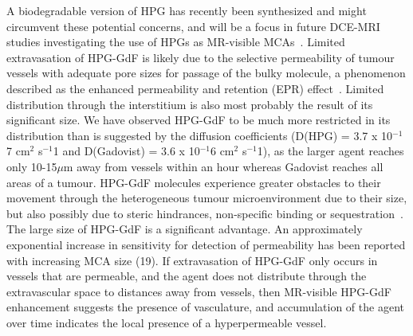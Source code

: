 A biodegradable version of HPG has recently been synthesized and might circumvent these potential concerns, and will be a focus in future \acs{DCE-MRI} studies investigating the use of HPGs as MR-visible \acs{MCA}s~\cite{Shenoi:2013id}.
Limited extravasation of \acs{HPG-GdF} is likely due to the selective permeability of tumour vessels with adequate pore sizes for passage of the bulky molecule, a phenomenon described as the enhanced permeability and retention (\acs{EPR}) effect~\cite{Maeda:2013hq}.
Limited distribution through the interstitium is also most probably the result of its significant size.
We have observed \acs{HPG-GdF} to be much more restricted in its distribution than is suggested by the diffusion coefficients (D(HPG) = 3.7 x 10$^{-1}$7 cm$^2$ s$^{-1}$1 and D(Gadovist) = 3.6 x 10$^{-1}$6 cm$^2$ s$^{-1}$1), as the larger agent reaches only 10-15$\mu$m away from vessels within an hour whereas Gadovist reaches all areas of a tumour.
\acs{HPG-GdF} molecules experience greater obstacles to their movement through the heterogeneous tumour microenvironment due to their size, but also possibly due to steric hindrances, non-specific binding or sequestration~\cite{Minchinton:2006gs}.
The large size of \acs{HPG-GdF} is a significant advantage.
An approximately exponential increase in sensitivity for detection of permeability has been reported with increasing MCA size (19).
If extravasation of \acs{HPG-GdF} only occurs in vessels that are permeable, and the agent does not distribute through the extravascular space to distances away from vessels, then MR-visible \acs{HPG-GdF} enhancement suggests the presence of vasculature, and accumulation of the agent over time indicates the local presence of a hyperpermeable vessel.

